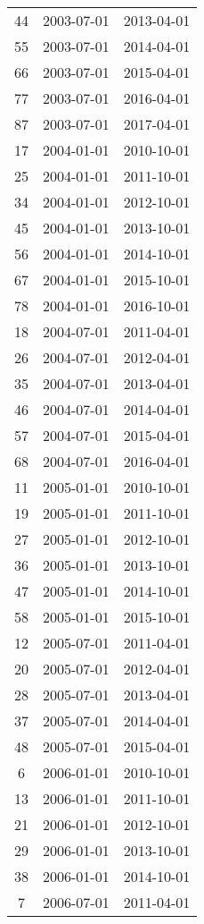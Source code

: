 \begin{tabular}{ccc}
  44 & 2003-07-01 & 2013-04-01 \\ 
  55 & 2003-07-01 & 2014-04-01 \\ 
  66 & 2003-07-01 & 2015-04-01 \\ 
  77 & 2003-07-01 & 2016-04-01 \\ 
  87 & 2003-07-01 & 2017-04-01 \\ 
  17 & 2004-01-01 & 2010-10-01 \\ 
  25 & 2004-01-01 & 2011-10-01 \\ 
  34 & 2004-01-01 & 2012-10-01 \\ 
  45 & 2004-01-01 & 2013-10-01 \\ 
  56 & 2004-01-01 & 2014-10-01 \\ 
  67 & 2004-01-01 & 2015-10-01 \\ 
  78 & 2004-01-01 & 2016-10-01 \\ 
  18 & 2004-07-01 & 2011-04-01 \\ 
  26 & 2004-07-01 & 2012-04-01 \\ 
  35 & 2004-07-01 & 2013-04-01 \\ 
  46 & 2004-07-01 & 2014-04-01 \\ 
  57 & 2004-07-01 & 2015-04-01 \\ 
  68 & 2004-07-01 & 2016-04-01 \\ 
  11 & 2005-01-01 & 2010-10-01 \\ 
  19 & 2005-01-01 & 2011-10-01 \\ 
  27 & 2005-01-01 & 2012-10-01 \\ 
  36 & 2005-01-01 & 2013-10-01 \\ 
  47 & 2005-01-01 & 2014-10-01 \\ 
  58 & 2005-01-01 & 2015-10-01 \\ 
  12 & 2005-07-01 & 2011-04-01 \\ 
  20 & 2005-07-01 & 2012-04-01 \\ 
  28 & 2005-07-01 & 2013-04-01 \\ 
  37 & 2005-07-01 & 2014-04-01 \\ 
  48 & 2005-07-01 & 2015-04-01 \\ 
  6 & 2006-01-01 & 2010-10-01 \\ 
  13 & 2006-01-01 & 2011-10-01 \\ 
  21 & 2006-01-01 & 2012-10-01 \\ 
  29 & 2006-01-01 & 2013-10-01 \\ 
  38 & 2006-01-01 & 2014-10-01 \\ 
  7 & 2006-07-01 & 2011-04-01 \\ 

\end{tabular}
